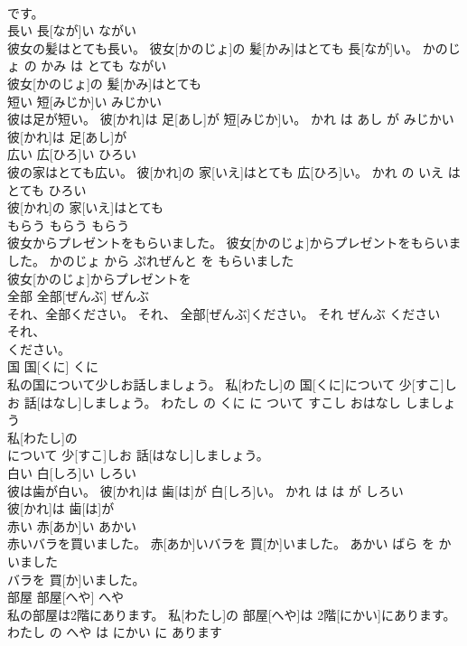 \documentclass[8pt]{extreport}
\begin{document}
\begin{CJK}{UTF8}{min}
\\	です。		
\\	長い	長[なが]い	ながい	
\\	彼女の髪はとても長い。	彼女[かのじょ]の 髪[かみ]はとても 長[なが]い。	かのじょ の かみ は とても ながい	
\\	彼女[かのじょ]の 髪[かみ]はとても
\\	短い	短[みじか]い	みじかい	
\\	彼は足が短い。	彼[かれ]は 足[あし]が 短[みじか]い。	かれ は あし が みじかい	
\\	彼[かれ]は 足[あし]が
\\	広い	広[ひろ]い	ひろい	
\\	彼の家はとても広い。	彼[かれ]の 家[いえ]はとても 広[ひろ]い。	かれ の いえ は とても ひろい	
\\	彼[かれ]の 家[いえ]はとても
\\	もらう	もらう	もらう	
\\	彼女からプレゼントをもらいました。	彼女[かのじょ]からプレゼントをもらいました。	かのじょ から ぷれぜんと を もらいました	
\\	彼女[かのじょ]からプレゼントを
\\	全部	全部[ぜんぶ]	ぜんぶ	
\\	それ、全部ください。	それ、 全部[ぜんぶ]ください。	それ ぜんぶ ください	
\\	それ、
\\	ください。		
\\	国	国[くに]	くに	
\\	私の国について少しお話しましょう。	私[わたし]の 国[くに]について 少[すこ]しお 話[はなし]しましょう。	わたし の くに に ついて すこし おはなし しましょう	
\\	私[わたし]の
\\	について 少[すこ]しお 話[はなし]しましょう。		
\\	白い	白[しろ]い	しろい	
\\	彼は歯が白い。	彼[かれ]は 歯[は]が 白[しろ]い。	かれ は は が しろい	
\\	彼[かれ]は 歯[は]が
\\	赤い	赤[あか]い	あかい	
\\	赤いバラを買いました。	赤[あか]いバラを 買[か]いました。	あかい ばら を かいました	
\\	バラを 買[か]いました。		
\\	部屋	部屋[へや]	へや	
\\	私の部屋は2階にあります。	私[わたし]の 部屋[へや]は 2階[にかい]にあります。	わたし の へや は にかい に あります	

\end{CJK}
\end{document}

